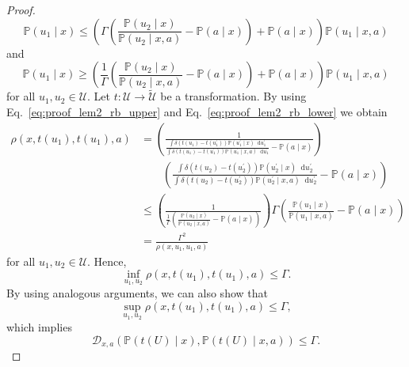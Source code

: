 \documentclass{article} %
\newcommand*\diff{\mathop{}\!\mathrm{d}}
\theoremstyle{definition}
\theoremstyle{plain}
\begin{document}
\begin{proof}
\begin{equation}\label{eq:proof_lem2_rb_upper}
 \mathbb{P}(u_1 \mid x) \leq \left(\Gamma \left( \frac{ \mathbb{P}(u_2 \mid x)}{ \mathbb{P}(u_2 \mid x, a)}  - \mathbb{P}(a \mid x)\right) + \mathbb{P}(a \mid x)\right) \mathbb{P}(u_1 \mid x, a)  
\end{equation}
and 
\begin{equation}\label{eq:proof_lem2_rb_lower}
 \mathbb{P}(u_1 \mid x) \geq \left(\frac{1}{\Gamma} \left( \frac{ \mathbb{P}(u_2 \mid x)}{ \mathbb{P}(u_2 \mid x, a)}  - \mathbb{P}(a \mid x)\right) + \mathbb{P}(a \mid x)\right) \mathbb{P}(u_1 \mid x, a)
\end{equation}
for all $u_1, u_2 \in \mathcal{U}$. Let $t \colon \mathcal{U} \to \widetilde{\mathcal{U}}$ be a transformation. By using Eq.~\eqref{eq:proof_lem2_rb_upper} and Eq.~\eqref{eq:proof_lem2_rb_lower} we obtain
\begin{align}
\rho(x, t(u_1), t(u_1), a)
&= \left( \frac{1}{\frac{\int \delta(t(u_1) - t(u^\prime_1))\mathbb{P}(u^\prime_1 \mid x) \diff u^\prime_1}{\int \delta(t(u_1) - t(u^\prime_1))\mathbb{P}(u^\prime_1 \mid x, a) \diff u^\prime_1} - \mathbb{P}(a \mid x)} \right) \\
& \quad \quad \left( \frac{\int \delta(t(u_2) - t(u^\prime_2))\mathbb{P}(u^\prime_2 \mid x) \diff u^\prime_2}{\int \delta(t(u_2) - t(u^\prime_2))\mathbb{P}(u^\prime_2 \mid x, a) \diff u^\prime_2} - \mathbb{P}(a \mid x)\right) \\
&\leq \left( \frac{1}{\frac{1}{\Gamma} \left(\frac{\mathbb{P}(u_2 \mid x)}{\mathbb{P}(u_2 \mid x, a) } - \mathbb{P}(a \mid x) \right)} \right) \Gamma \left( \frac{\mathbb{P}(u_1 \mid x)}{\mathbb{P}(u_1 \mid x, a)} - \mathbb{P}(a \mid x) \right) \\
 &= \frac{\Gamma^2}{\rho(x, u_1, u_1, a)}
\end{align}
for all $u_1, u_2 \in \mathcal{U}$. Hence, 
\begin{equation}
\inf_{u_1, u_2} \rho(x, t(u_1), t(u_1), a) \leq \Gamma.     
\end{equation}
By using analogous arguments, we can also show that 
\begin{equation}
\sup_{u_1, u_2} \rho(x, t(u_1), t(u_1), a) \leq \Gamma,     
\end{equation}
which implies
\begin{equation}
    \mathcal{D}_{x,a}(\mathbb{P}(t(U) \mid x), \mathbb{P}(t(U) \mid x, a)) \leq \Gamma.
\end{equation}
\end{proof}
\end{document}
